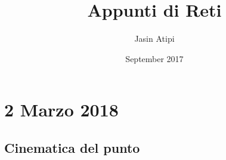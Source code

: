 \documentclass{article}
\title{Appunti di Reti}
\author{Jasin Atipi}
\date{September 2017}
\begin{document}
\maketitle

\section*{2 Marzo 2018}
\subsection{Cinematica del punto}
\end{document}
